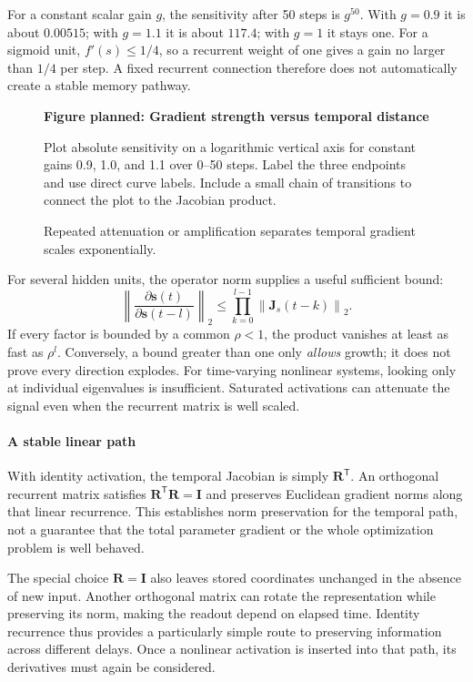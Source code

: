 \documentclass[11pt, oneside]{book}
\newcommand{\norm}[1]{\left\lVert #1 \right\rVert}
\newcommand{\T}{^{\mathsf{T}}}           %
\newcommand{\figureplaceholder}[5]{%
\begin{figure}[htbp]
\centering
\begin{tcolorbox}[unbreakable,width=\linewidth,height=#1,colback=accent!3,
  colframe=accent!30,boxrule=0.5pt,arc=2.5mm,sharp corners=all,
  valign=center,halign=center,fontupper=\small]
{\bfseries\color{accent}Figure planned: #2}\par\medskip
{\color{gray!75!black}#3}
\end{tcolorbox}
\caption{#4}\label{#5}
\end{figure}}
\begin{document}
\begin{exbox}[title={Small per-step changes become large over time}]
For a constant scalar gain $g$, the sensitivity after 50 steps is $g^{50}$. With $g=0.9$ it is about $0.00515$; with $g=1.1$ it is about $117.4$; with $g=1$ it stays one. For a sigmoid unit, $f'(s)\leq1/4$, so a recurrent weight of one gives a gain no larger than $1/4$ per step. A fixed recurrent connection therefore does not automatically create a stable memory pathway.
\end{exbox}

\figureplaceholder{3.0cm}{Gradient strength versus temporal distance}{Plot absolute sensitivity on a logarithmic vertical axis for constant gains 0.9, 1.0, and 1.1 over 0--50 steps. Label the three endpoints and use direct curve labels. Include a small chain of transitions to connect the plot to the Jacobian product.}{Repeated attenuation or amplification separates temporal gradient scales exponentially.}{fig:gradient-distance}

For several hidden units, the operator norm supplies a useful sufficient bound:
\[
 \left\|\frac{\partial\mathbf{s}(t)}{\partial\mathbf{s}(t-l)}\right\|_2
 \leq\prod_{k=0}^{l-1}\norm{\mathbf{J}_s(t-k)}_2.
\]
If every factor is bounded by a common $\rho<1$, the product vanishes at least as fast as $\rho^l$. Conversely, a bound greater than one only \emph{allows} growth; it does not prove every direction explodes. For time-varying nonlinear systems, looking only at individual eigenvalues is insufficient. Saturated activations can attenuate the signal even when the recurrent matrix is well scaled.

\paragraph{A stable linear path} With identity activation, the temporal Jacobian is simply $\mathbf{R}\T$. An orthogonal recurrent matrix satisfies $\mathbf{R}\T\mathbf{R}=\mathbf{I}$ and preserves Euclidean gradient norms along that linear recurrence. This establishes norm preservation for the temporal path, not a guarantee that the total parameter gradient or the whole optimization problem is well behaved.

The special choice $\mathbf{R}=\mathbf{I}$ also leaves stored coordinates unchanged in the absence of new input. Another orthogonal matrix can rotate the representation while preserving its norm, making the readout depend on elapsed time. Identity recurrence thus provides a particularly simple route to preserving information across different delays. Once a nonlinear activation is inserted into that path, its derivatives must again be considered.
\end{document}
